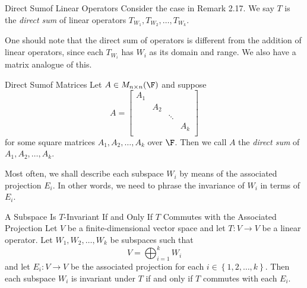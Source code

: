 \documentclass[linearalgebraII]{subfiles}
\begin{document}
    \begin{definition}{Direct Sum}{of Linear Operators}
        Consider the case in Remark 2.17. We say $T$ is the \emph{direct sum} of linear operators $T_{W_1}, T_{W_2}, \ldots, T_{W_k}$.
    \end{definition}
    
    \begin{remark}
        One should note that the direct sum of operators is different from the addition of linear operators, since each $T_{W_i}$ has $W_i$ as its domain and range. We also have a matrix analogue of this. 
    \end{remark}

    \begin{definition}{Direct Sum}{of Matrices}
        Let $A\in M_{n\times n}(\F)$ and suppose
        \begin{equation*}
            A =
            \begin{bmatrix}
                A_1& & & \\
                & A_2& & \\
                & & \ddots& \\
                & & & A_k\\
            \end{bmatrix}
        \end{equation*}
        for some square matrices $A_1,A_2,\ldots,A_k$ over $\F$. Then we call $A$ the \emph{direct sum} of $A_1,A_2,\ldots,A_k$.
    \end{definition}

    \begin{remark}
        Most often, we shall describe each subspace $W_i$ by means of the associated projection $E_i$. In other words, we need to phrase the invariance of $W_i$ in terms of $E_i$.
    \end{remark}

    \begin{prop}{A Subspace Is $T$-Invariant If and Only If $T$ Commutes with the Associated Projection}
        Let $V$ be a finite-dimensional vector space and let $T:V\to V$ be a linear operator. Let $W_1, W_2, \ldots, W_k$ be subspaces such that
        \begin{equation*}
            V = \bigoplus^{k}_{i=1} W_i
        \end{equation*}
        and let $E_i:V\to V$ be the associated projection for each $i\in \left\lbrace 1, 2, \ldots, k \right\rbrace$. Then each subspace $W_i$ is invariant under $T$ if and only if $T$ commutes with each $E_i$.
    \end{prop}
\end{document}
